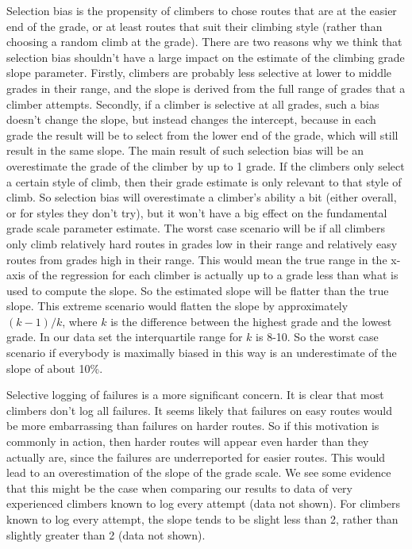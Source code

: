 \documentclass[ba]{imsart}
\begin{document}
Selection bias is the propensity of climbers to chose routes that are at the easier end of the grade, or at least routes that suit their climbing style (rather than choosing a random climb at the grade). There are two reasons why we think that selection bias shouldn't have a large impact on the estimate of the climbing grade slope parameter. Firstly, climbers are probably less selective at lower to middle grades in their range, and the slope is derived from the full range of grades that a climber attempts. Secondly, if a climber is selective at all grades, such a bias doesn't change the slope, but instead changes the intercept, because in each grade the result will be to select from the lower end of the grade, which will still result in the same slope. The main result of such selection bias will be an overestimate the grade of the climber by up to 1 grade. If the climbers only select a certain style of climb, then their grade estimate is only relevant to that style of climb. So selection bias will overestimate a climber's ability a bit (either overall, or for styles they don't try), but it won't have a big effect on the fundamental grade scale parameter estimate. The worst case scenario will be if all climbers only climb relatively hard routes in grades low in their range and relatively easy routes from grades high in their range. This would mean the true range in the x-axis of the regression for each climber is actually up to a grade less than what is used to compute the slope. So the estimated slope will be flatter than the true slope. This extreme scenario would flatten the slope by approximately $(k-1)/k$, where $k$ is the difference between the highest grade and the lowest grade. In our data set the interquartile range for $k$ is 8-10. So the worst case scenario if everybody is maximally biased in this way is an underestimate of the slope of about 10\%.

Selective logging of failures is a more significant concern. It is clear that most climbers don't log all failures. It seems likely that failures on easy routes would be more embarrassing than failures on harder routes. So if this motivation is commonly in action, then harder routes will appear even harder than they actually are, since the failures are underreported for easier routes. This would lead to an overestimation of the slope of the grade scale. We see some evidence that this might be the case when comparing our results to data of very experienced climbers known to log every attempt (data not shown). For climbers known to log every attempt, the slope tends to be slight less than 2, rather than slightly greater than 2 (data not shown).
\end{document}
